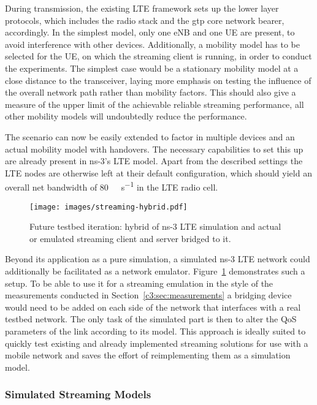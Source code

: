 During transmission, the existing \gls{LTE} framework sets up the lower layer protocols, which includes the radio stack and the \gls{gtp} core network bearer, accordingly. In the simplest model, only one \gls{eNB} and one \gls{UE} are present, to avoid interference with other devices. Additionally, a mobility model has to be selected for the \gls{UE}, on which the streaming client is running, in order to conduct the experiments. The simplest case would be a stationary mobility model at a close distance to the transceiver, laying more emphasis on testing the influence of the overall network path rather than mobility factors. This should also give a measure of the upper limit of the achievable reliable streaming performance, all other mobility models will undoubtedly reduce the performance.

The scenario can now be easily extended to factor in multiple devices and an actual mobility model with handovers. The necessary capabilities to set this up are already present in ns-3's \gls{LTE} model. Apart from the described settings the \gls{LTE} nodes are otherwise left at their default configuration, which should yield an overall net bandwidth of \SI{80}{\mega\bit\per\second} in the \gls{LTE} radio cell.

\begin{figure}[htb]
	\centering
	\texttt{[image: images/streaming-hybrid.pdf]}
	\caption{Future testbed iteration: hybrid of ns-3 \acrshort{LTE} simulation and actual or emulated streaming client and server bridged to it.}
\label{c6:fig:streaming-hybrid}
\end{figure}

Beyond its application as a pure simulation, a simulated ns-3 \gls{LTE} network could additionally be facilitated as a network emulator. Figure~\ref{c6:fig:streaming-hybrid} demonstrates such a setup. To be able to use it for a streaming emulation in the style of the measurements conducted in Section~\ref{c3:sec:measurements} a bridging device would need to be added on each side of the network that interfaces with a real testbed network. The only task of the simulated part is then to alter the \gls{QoS} parameters of the link according to its model. This approach is ideally suited to quickly test existing and already implemented streaming solutions for use with a mobile network and saves the effort of reimplementing them as a simulation model.


\subsubsection{Simulated Streaming Models}

